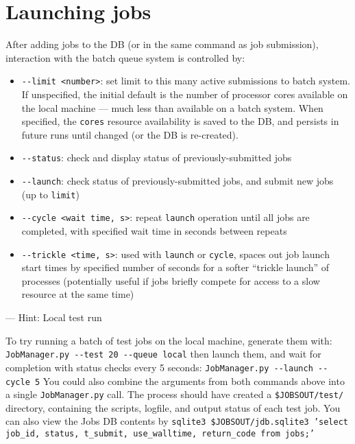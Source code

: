 \documentclass[12pt,english]{article}
\newenvironment{hint}[1][{}]{
\definecolor{shadecolor}{rgb}{.9,.9,.9}
\begin{shaded}
{\color{purple}--- Hint: #1}

}{\end{shaded}}
\newcommand{\cd}[1]{\texorpdfstring{{\color{blue} \texttt{#1}}}{#1}}
\begin{document}
\section{Launching jobs}

After adding jobs to the DB (or in the same command as job submission),
    interaction with the batch queue system is controlled by:
\begin{itemize}
    \item \cd{{-}{-}limit <number>}: set limit to this many active submissions to batch system.
        If unspecified, the initial default is the number of processor cores available on the local machine
            --- much less than available on a batch system.
        When specified, the \cd{cores} resource availability is saved to the DB, and persists
        in future runs until changed (or the DB is re-created).
    \item \cd{{-}{-}status}: check and display status of previously-submitted jobs
    \item \cd{{-}{-}launch}: check status of previously-submitted jobs, and submit new jobs (up to \cd{limit})
    \item \cd{{-}{-}cycle <wait time, s>}: repeat \cd{launch} operation until all jobs are completed,
        with specified wait time in seconds between repeats
    \item \cd{{-}{-}trickle <time, s>}: used with \cd{launch} or \cd{cycle}, spaces out job launch start times
        by specified number of seconds for a softer ``trickle launch'' of processes
        (potentially useful if jobs briefly compete for access to a slow resource at the same time)
\end{itemize}

\begin{hint}[Local test run]
To try running a batch of test jobs on the local machine, generate them with: \newline
\cd{JobManager.py {-}{-}test 20 {-}{-}queue local} \newline
then launch them, and wait for completion with status checks every 5 seconds: \newline
\cd{JobManager.py {-}{-}launch {-}{-}cycle 5} \newline
You could also combine the arguments from both commands above into a single \cd{JobManager.py} call.
The process should have created a \cd{\$JOBSOUT/test/} directory,
    containing the scripts, logfile, and output status of each test job.
You can also view the Jobs DB contents by \newline
\cd{sqlite3 \$JOBSOUT/jdb.sqlite3 'select job\_id, status, t\_submit, use\_walltime, return\_code from jobs;'}
\end{hint}
\end{document}
